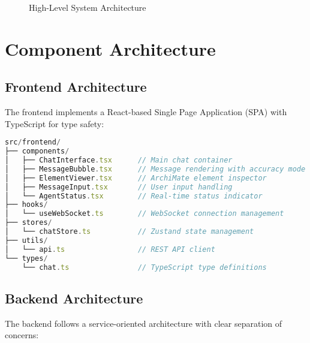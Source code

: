 \documentclass[12pt,a4paper]{report}
\begin{document}
\begin{figure}[H]
\caption{High-Level System Architecture}
\end{figure}

\section{Component Architecture}

\subsection{Frontend Architecture}

The frontend implements a React-based Single Page Application (SPA) with TypeScript for type safety:

\begin{lstlisting}[language=JavaScript, caption=Frontend Component Structure]
src/frontend/
├── components/
│   ├── ChatInterface.tsx      // Main chat container
│   ├── MessageBubble.tsx      // Message rendering with accuracy mode
│   ├── ElementViewer.tsx      // ArchiMate element inspector
│   ├── MessageInput.tsx       // User input handling
│   └── AgentStatus.tsx        // Real-time status indicator
├── hooks/
│   └── useWebSocket.ts        // WebSocket connection management
├── stores/
│   └── chatStore.ts           // Zustand state management
├── utils/
│   └── api.ts                 // REST API client
└── types/
    └── chat.ts                // TypeScript type definitions
\end{lstlisting}

\subsection{Backend Architecture}

The backend follows a service-oriented architecture with clear separation of concerns:
\end{document}
